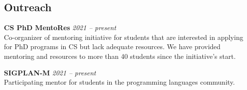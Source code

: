 \documentclass[margin]{res}
\begin{document}
\begin{resume}









\section{Outreach}
\hypertarget{sec:outreach}{}

\textbf{CS PhD MentoRes}  \hfill {\em 2021 -- present} \\
Co-organizer of mentoring initiative for students that are interested in applying for PhD programs in CS but lack adequate resources. We have provided mentoring and resources to more than 40 students since the initiative's start.

\textbf{SIGPLAN-M}  \hfill {\em 2021 -- present} \\
Participating mentor for students in the programming languages community.


\end{resume}
\end{document}
